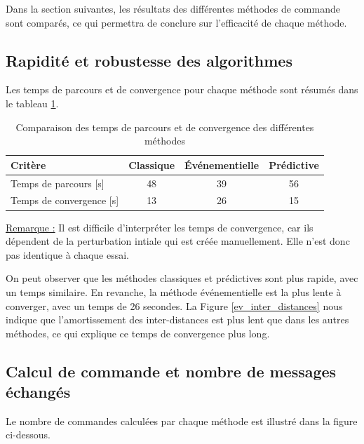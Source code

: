 Dans la section suivantes, les résultats des différentes méthodes de commande sont comparés, ce qui permettra de conclure sur l'efficacité de chaque méthode.

\subsection{Rapidité et robustesse des algorithmes}

Les temps de parcours et de convergence pour chaque méthode sont résumés dans le tableau \ref{tab:temps-parcours-convergence}.

\begin{table}[H]
    \centering
    \caption{Comparaison des temps de parcours et de convergence des différentes méthodes}
    \label{tab:temps-parcours-convergence}
    \begin{tabular}{|l|c|c|c|}
        \hline
        Critère & Classique & Événementielle & Prédictive \\
        \hline
        Temps de parcours [s] & 48 & 39 & 56 \\
        \hline
        Temps de convergence [s] & 13 & 26 & 15 \\
        \hline
    \end{tabular}
\end{table}

\underline{Remarque :} Il est difficile d'interpréter les temps de convergence, car ils dépendent de la perturbation intiale qui est créée manuellement. Elle n'est donc pas identique à chaque essai.

On peut observer que les méthodes classiques et prédictives sont plus rapide, avec un temps similaire. En revanche, la méthode événementielle est la plus lente à converger, avec un temps de 26 secondes. La Figure \ref{ev_inter_distances} nous indique que l'amortissement des inter-distances est plus lent que dans les autres méthodes, ce qui explique ce temps de convergence plus long.
\subsection{Calcul de commande et nombre de messages échangés}

\noindent Le nombre de commandes calculées par chaque méthode est illustré dans la figure ci-dessous.


